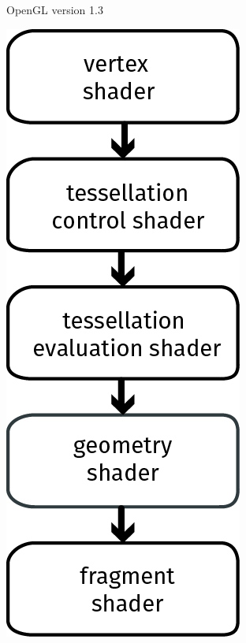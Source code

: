 \begin{figure}
\begin{subfigure}[b]{0.4\columnwidth}
		\caption{OpenGL version 1.3}
		\label{fig:implementation:pipeline:old}
	\end{subfigure}
	\begin{subfigure}[b]{0.4\columnwidth}
		\centering
		\includegraphics[width=\textwidth]{content/img/implementation/pipeline_newOpenGL.png}

\end{subfigure}
\end{figure}

